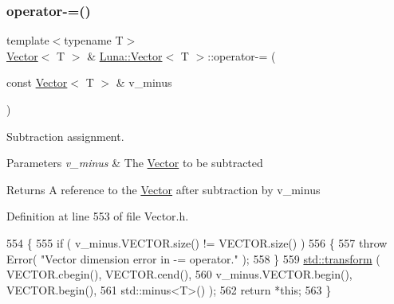\subsubsection{\texorpdfstring{operator-\/=()}{operator-=()}\hspace{0.1cm}{\footnotesize\ttfamily [1/2]}}
{\footnotesize\ttfamily template$<$typename T$>$ \\
\hyperlink{classLuna_1_1Vector}{Vector}$<$ T $>$ \& \hyperlink{classLuna_1_1Vector}{Luna\+::\+Vector}$<$ T $>$\+::operator-\/= (\begin{DoxyParamCaption}\item[{const \hyperlink{classLuna_1_1Vector}{Vector}$<$ T $>$ \&}]{v\+\_\+minus }\end{DoxyParamCaption})\hspace{0.3cm}{\ttfamily [inline]}}



Subtraction assignment. 


\begin{DoxyParams}{Parameters}
{\em v\+\_\+minus} & The \hyperlink{classLuna_1_1Vector}{Vector} to be subtracted \\
\hline
\end{DoxyParams}
\begin{DoxyReturn}{Returns}
A reference to the \hyperlink{classLuna_1_1Vector}{Vector} after subtraction by v\+\_\+minus 
\end{DoxyReturn}


Definition at line 553 of file Vector.\+h.


\begin{DoxyCode}
554   \{
555     \textcolor{keywordflow}{if} ( v\_minus.VECTOR.size() != VECTOR.size() )
556     \{
557       \textcolor{keywordflow}{throw} Error( \textcolor{stringliteral}{"Vector dimension error in -= operator."} );
558     \}
559     \hyperlink{namespaceHeat__plot_aeaa6785bedcad63b4bd40e8cb1bad8a0}{std::transform} ( VECTOR.cbegin(), VECTOR.cend(),
560                      v\_minus.VECTOR.begin(), VECTOR.begin(),
561                      std::minus<T>() );
562     \textcolor{keywordflow}{return} *\textcolor{keyword}{this};
563   \}
\end{DoxyCode}
\mbox{\label{classLuna_1_1Vector_a407921bee5f382c34030217e3d2a2417}} 
